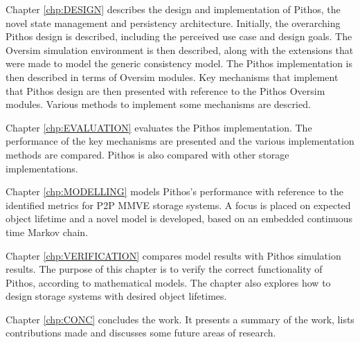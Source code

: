 Chapter \ref{chp:DESIGN} describes the design and implementation of Pithos, the novel state management and persistency architecture. Initially, the overarching Pithos design is described, including the perceived use case and design goals. The Oversim simulation environment is then described, along with the extensions that were made to model the generic consistency model. The Pithos implementation is then described in terms of Oversim modules. Key mechanisms that implement that Pithos design are then presented with reference to the Pithos Oversim modules. Various methods to implement some mechanisms are descried.

Chapter \ref{chp:EVALUATION} evaluates the Pithos implementation. The performance of the key mechanisms are presented and the various implementation methods are compared. Pithos is also compared with other storage implementations.

Chapter \ref{chp:MODELLING} models Pithos's performance with reference to the identified metrics for P2P MMVE storage systems. A focus is placed on expected object lifetime and a novel model is developed, based on an embedded continuous time Markov chain.

Chapter \ref{chp:VERIFICATION} compares model results with Pithos simulation results. The purpose of this chapter is to verify the correct functionality of Pithos, according to mathematical models. The chapter also explores how to design storage systems with desired object lifetimes.

Chapter \ref{chp:CONC} concludes the work. It presents a summary of the work, lists contributions made and discusses some future areas of research.
